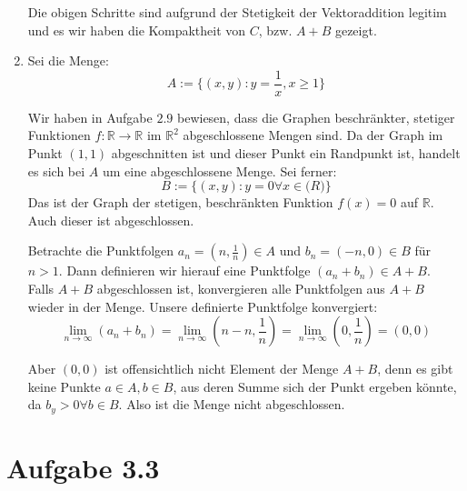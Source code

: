 \documentclass[a4paper,german,12pt,smallheadings]{scrartcl}
\begin{document}
\begin{enumerate}[(1)]
    Die obigen Schritte sind aufgrund der Stetigkeit der Vektoraddition legitim und es wir haben die Kompaktheit von $C$, bzw. $A+B$ gezeigt.
  \item
    Sei die Menge:
    \begin{equation*}
    A := \{(x,y): y = \frac{1}{x}, x \ge 1\}
    \end{equation*}
    
    Wir
    haben in Aufgabe $2.9$ bewiesen, dass die Graphen beschränkter, stetiger Funktionen $f:
\mathbb{R} \to \mathbb{R}$ im $\mathbb{R}^2$ abgeschlossene Mengen sind. Da der
    Graph im Punkt $(1,1)$ abgeschnitten ist und dieser Punkt ein Randpunkt ist,
    handelt es sich bei $A$ um eine abgeschlossene Menge.
    Sei ferner:
    \begin{equation*}
    B:=\{(x,y): y=0 \forall x\in \mathbb(R)\}
    \end{equation*}
    Das ist der Graph der stetigen, beschränkten Funktion $f(x) =
0$ auf $\mathbb{R}$. Auch dieser ist abgeschlossen.

    Betrachte die Punktfolgen $a_n = (n, \frac{1}{n}) \in A$ und $b_n = (-n, 0) \in B$ für $n > 1$. Dann definieren wir hierauf eine Punktfolge $(a_n+b_n)\in A+B$.\\
    Falls $A+B$ abgeschlossen ist, konvergieren alle Punktfolgen aus $A+B$ wieder in der Menge. Unsere definierte Punktfolge konvergiert:
    \begin{equation*}
    \lim\limits_{n\to\infty}(a_n+b_n)=\lim\limits_{n\to\infty}\left(n-n,\frac{1}{n}\right)=\lim\limits_{n\to\infty}\left(0,\frac{1}{n}\right)=(0,0)
    \end{equation*}
	
	Aber $(0,0)$ ist offensichtlich nicht Element der Menge $A+B$, denn es gibt keine Punkte $a\in A,b\in B$, aus deren Summe sich der Punkt ergeben könnte, da $b_y>0 \forall b\in B$. Also ist die Menge nicht abgeschlossen.
\end{enumerate}

\section*{Aufgabe 3.3}
\end{document}
